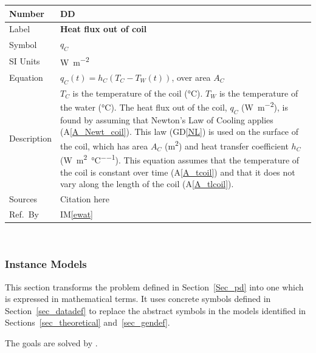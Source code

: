 \documentclass[12pt]{article}
\newcommand{\colAwidth}{0.13\textwidth}
\newcommand{\colBwidth}{0.82\textwidth}
\newcounter{defnum} %
\newcommand{\dref}[1]{GD\ref{#1}}
\newcounter{datadefnum} %
\newcommand{\aref}[1]{A\ref{#1}}
\newcommand{\iref}[1]{IM\ref{#1}}
\begin{document}
\noindent
\begin{minipage}{\textwidth}
	\renewcommand*{\arraystretch}{1.5}
	\begin{tabular}{| p{\colAwidth} | p{\colBwidth}|}
		\hline
		\rowcolor[gray]{0.9}
		Number& DD{datadefnum}\thedatadefnum \label{FluxCoil}\\
		\hline
		Label& \bf Heat flux out of coil\\
		\hline
		Symbol &$q_C$\\
		\hline
		SI Units & \si{\watt\per\square\metre}\\
		\hline
		Equation&$q_C(t) = h_C (T_C - T_W(t))$, over area $A_C$\\
		\hline
		Description & 
		$T_C$ is the temperature of the coil (\si{\celsius}).  $T_W$ is the temperature of the water (\si{\celsius}).  
		The heat flux out of the coil, $q_C$ (\si{\watt\per\square\metre}), is found by
		assuming that Newton's Law 
		of Cooling applies (\aref{A_Newt_coil}).  This law (\dref{NL}) is used on the surface of
		the coil, which has area $A_C$ (\si{\square\metre}) and heat 
		transfer coefficient $h_C$
		(\si{\watt\per\square\metre\per\celsius}).  This equation
		assumes that the temperature of the coil is constant over time (\aref{A_tcoil}) and that it does not vary along the length
		of the coil (\aref{A_tlcoil}).
		\\
		\hline
		Sources& Citation here \\
		\hline
		Ref.\ By & \iref{ewat}\\
		\hline
	\end{tabular}
\end{minipage}\\





\subsubsection{Instance Models} \label{sec_instance}    

This section transforms the problem defined in Section~\ref{Sec_pd} into 
one which is expressed in mathematical terms. It uses concrete symbols defined 
in Section~\ref{sec_datadef} to replace the abstract symbols in the models 
identified in Sections~\ref{sec_theoretical} and~\ref{sec_gendef}.

The goals  are solved by .  
\end{document}

